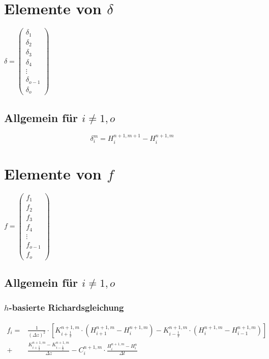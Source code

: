 \documentclass[a4paper,12pt] {article}
\begin{document}
\section{Elemente von $\delta$}

\begin{math}
  \delta = 
  \begin{pmatrix}
    \delta_1 \\
    \delta_2 \\
    \delta_3 \\
    \delta_4 \\
    \vdots \\
    \delta_{o-1} \\
    \delta_o
  \end{pmatrix}
\end{math}

\subsection{Allgemein für $i \neq 1,o$}

\begin{equation*}
  \delta_i^m = H_i^{n+1,m+1} - H_i^{n+1,m}
\end{equation*}

\section{Elemente von $f$}

\begin{math}
  f = 
  \begin{pmatrix}
    f_1 \\
    f_2 \\
    f_3 \\
    f_4 \\
    \vdots \\
    f_{o-1} \\
    f_o
  \end{pmatrix}
\end{math}

\subsection{Allgemein für $i \neq 1,o$}

\subsubsection{$h$-basierte Richardsgleichung}

\begin{equation*}
  \begin{split}
    f_i = &\frac{1}{\left(\Delta z\right)^2} \cdot \left[K_{i+\frac{1}{2}}^{n+1,m} \cdot \left(H_{i+1}^{n+1,m} - H_i^{n+1,m}\right) - K_{i-\frac{1}{2}}^{n+1,m} \cdot \left(H_{i}^{n+1,m} - H_{i-1}^{n+1,m}\right)\right] \\
    + &\frac{K_{i+\frac{1}{2}}^{n+1,m} - K_{i-\frac{1}{2}}^{n+1,m}}{\Delta z} - C_i^{n+1,m} \cdot \frac{H_i^{n+1,m} - H_i^n}{\Delta t}
  \end{split}
\end{equation*}
\end{document}
